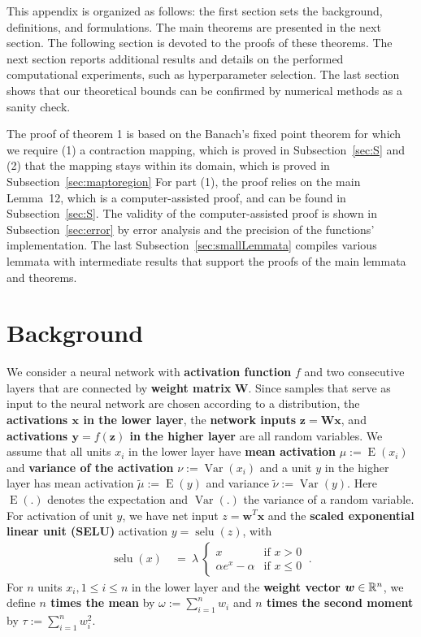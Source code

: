 \documentclass{article}
\newcommand\Bw{\bm{w}}
\newcommand\Bx{\bm{x}}
\newcommand\By{\bm{y}}
\newcommand\Bz{\bm{z}}
\newcommand\BW{\bm{W}}
\newcommand\munn{{\tilde \mu}}
\newcommand\nunn{{\tilde \nu}}
\renewcommand{\leq}{\leqslant}
\DeclareMathOperator{\E}{E}
\DeclareMathOperator{\Var}{Var}
\DeclareMathOperator{\selu}{selu}
\begin{document}
\setcounter{theorem}{0}
\tableofcontents




\vspace{1cm}
This appendix is organized as follows: the first section 
sets the background, definitions, and formulations.
The main theorems are presented in the next section.
The following section is devoted to the proofs of these theorems.
The next section reports additional results and details on the
performed computational experiments, such as hyperparameter selection. 
The last section shows that our theoretical bounds can be
confirmed by numerical methods as a sanity check.

The proof of theorem 1 is based on the Banach's fixed point theorem 
for which we require (1) a contraction mapping, which is proved in Subsection~\ref{sec:S}
and (2) that the mapping stays within its domain, which is proved in Subsection~\ref{sec:maptoregion}
For part (1), the proof relies on the main Lemma~12, which is a computer-assisted proof, and can be found 
in Subsection~\ref{sec:S}. The validity of the computer-assisted proof is shown in Subsection~\ref{sec:error} by 
error analysis and the precision of the functions' implementation. 
The last Subsection~\ref{sec:smallLemmata} compiles various lemmata with intermediate results that support 
the proofs of the main lemmata and theorems.

\section{Background}
\label{sec:fixedpointanalysis}
We consider a neural network with {\bf activation function} $f$ and 
two consecutive layers that are connected by {\bf weight matrix} $\BW$.
Since samples that serve as input to the neural network are chosen according to a distribution, 
the  {\bf activations $\Bx$ in the lower layer}, 
the {\bf network inputs} $\Bz=\BW \Bx$, and {\bf activations $\By=f(\Bz)$ in the
higher layer} are all random variables. We assume that all units $x_i$ in the lower layer
have {\bf mean activation} $\mu:=\E(x_i)$ and {\bf variance of the
activation}
$\nu:=\Var(x_i)$ and a unit $y$ in the
higher layer has mean activation $\munn:=\E(y)$ and variance
$\nunn:=\Var(y)$. Here $\E(.)$ denotes the expectation and
$\Var(.)$ the variance of a random variable.
For activation of unit $y$, we have net input  $z=\Bw^T \Bx$ and 
the {\bf scaled exponential linear unit (SELU)}
activation $y=\selu(z)$, with 
\begin{align}
 \selu(x) \ &= \ \lambda 
\ \begin{cases}
  x & \text{if } x > 0 \\
 \alpha e^{x}-\alpha & \text{if } x \leq 0
 \end{cases}  \ .
\end{align}
For $n$ units $x_i, 1\leq i \leq n$ in the lower layer and 
the {\bf weight vector} $\Bw \in \dR^n$, we define 
{\bf $n$ times the mean} by $\omega:=\sum_{i=1}^n  w_i$ 
and {\bf $n$ times the second moment} by $\tau:=\sum_{i=1}^n  w_i^2$.
\end{document}
